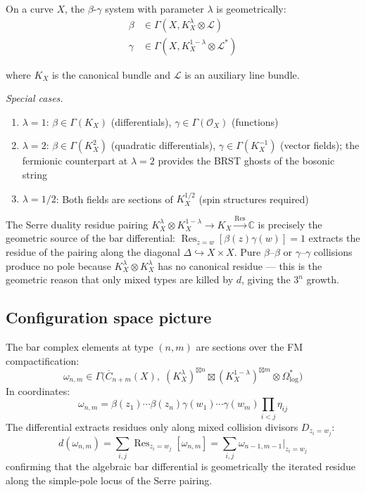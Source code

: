 \begin{construction}
\label{const:geometric-beta-gamma}
On a curve $X$, the $\beta$-$\gamma$ system with parameter $\lambda$ is geometrically:
\begin{align}
\beta &\in \Gamma(X, K_X^\lambda \otimes \mathcal{L})\\
\gamma &\in \Gamma(X, K_X^{1-\lambda} \otimes \mathcal{L}^*)
\end{align}

where $K_X$ is the canonical bundle and $\mathcal{L}$ is an auxiliary line bundle.

\emph{Special cases.}
\begin{enumerate}
\item $\lambda = 1$: $\beta \in \Gamma(K_X)$ (differentials), $\gamma \in \Gamma(\mathcal{O}_X)$ (functions)
\item $\lambda = 2$: $\beta \in \Gamma(K_X^2)$ (quadratic differentials), $\gamma \in \Gamma(K_X^{-1})$ (vector fields); the fermionic counterpart at $\lambda = 2$ provides the BRST ghosts of the bosonic string
\item $\lambda = 1/2$: Both fields are sections of $K_X^{1/2}$ (spin structures required)
\end{enumerate}
\end{construction}

\begin{remark}
\label{rem:bundle-bar-mechanism}
The Serre duality residue pairing $K_X^\lambda \otimes K_X^{1-\lambda} \to K_X \xrightarrow{\mathrm{Res}} \mathbb{C}$ is precisely the geometric source of the bar differential: $\operatorname{Res}_{z=w}[\beta(z)\gamma(w)] = 1$ extracts the residue of the pairing along the diagonal $\Delta \hookrightarrow X \times X$.  Pure $\beta$--$\beta$ or $\gamma$--$\gamma$ collisions produce no pole because $K_X^\lambda \otimes K_X^\lambda$ has no canonical residue --- this is the geometric reason that only mixed types are killed by $d$, giving the $3^n$ growth.
\end{remark}

\subsection{Configuration space picture}

The bar complex elements at type $(n,m)$ are sections over the FM compactification:
\[\omega_{n,m} \in \Gamma\bigl(\overline{C}_{n+m}(X),\; (K_X^\lambda)^{\boxtimes n} \boxtimes (K_X^{1-\lambda})^{\boxtimes m} \otimes \Omega^*_{\log}\bigr)\]
In coordinates:
\[\omega_{n,m} = \beta(z_1) \cdots \beta(z_n) \gamma(w_1) \cdots \gamma(w_m) \prod_{i<j} \eta_{ij}\]
The differential extracts residues only along mixed collision divisors $D_{z_i = w_j}$:
\[d(\omega_{n,m}) = \sum_{i,j} \operatorname{Res}_{z_i = w_j}[\omega_{n,m}] = \sum_{i,j} \omega_{n-1,m-1}\big|_{z_i = w_j}\]
confirming that the algebraic bar differential is geometrically the iterated residue along the simple-pole locus of the Serre pairing.

